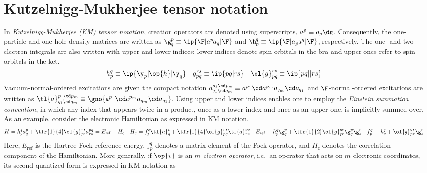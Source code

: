 \chapter{Kutzelnigg-Mukherjee tensor notation}

\minitoc

\begin{ntt}\label{ntt:kutzelnigg-mukherjee-notation}
In \textit{Kutzelnigg-Mukherjee (KM) tensor notation}, creation operators are denoted using superscripts, $a^p\equiv a_p\dg$.
Consequently, the one-particle and one-hole density matrices are written as
$
  \g^p_q
\equiv
  \ip{\F|a^pa_q|\F}
$
and
$
  \h_p^q
\equiv
  \ip{\F|a_p a^q|\F}
$,
respectively.
The one- and two-electron integrals are also written with upper and lower indices: lower indices denote spin-orbitals in the bra and upper ones refer to spin-orbitals in the ket.
\begin{align}
  h_p^q
\equiv
  \ip{\y_p|\op{h}|\y_q}
&&
  g_{pq}^{rs}
\equiv
  \ip{pq|rs}
&&
  \ol{g}_{pq}^{rs}
\equiv
  \ip{pq||rs}
\end{align}
Vacuum-normal-ordered excitations are given the compact notation
$
  a^{p_1\cd p_m}_{q_1\cd q_m}
\equiv
  a^{p_1}\cd a^{p_m}a_{q_m}\cd a_{q_1}
$
and $\F$-normal-ordered excitations are written as
$
  \tl{a}^{p_1\cd p_m}_{q_1\cd q_m}
\equiv
  \gno{a^{p_1}\cd a^{p_m}a_{q_m}\cd a_{q_1}}
$.
Using upper and lower indices enables one to employ the \textit{Einstein summation convention}, in which any index that appears twice in a product, once as a lower index and once as an upper one, is implicitly summed over.
As an example, consider the electronic Hamiltonian as expressed in KM notation.
\begin{align}
  H
=
  h_p^q
  a^p_q
+
  \tfr{1}{4}
  \ol{g}_{pq}^{rs}
  a^{pq}_{rs}
=
  E_{\text{ref}}
+
  H_{\text{c}}
&&
  H_{\text{c}}
=
  f_p^q
  \tl{a}^p_q
+
  \tfr{1}{4}
  \ol{g}_{pq}^{rs}
  \tl{a}^{pq}_{rs}
&&
  E_{\text{ref}}
\equiv
  h_p^q
  \g^p_q
+
  \tfr{1}{2}
  \ol{g}_{pr}^{qs}
  \g^p_q
  \g^r_s
&&
  f_p^q
\equiv
  h_p^q
+
  \ol{g}_{pr}^{qs}
  \g_s^r
\end{align}
Here, $E_{\text{ref}}$ is the Hartree-Fock reference energy, $f_p^q$ denotes a matrix element of the Fock operator, and $H_{\text{c}}$ denotes the correlation component of the Hamiltonian.
More generally, if $\op{v}$ is an \textit{$m$-electron operator}, i.e.\ an operator that acts on $m$ electronic coordinates, its second quantized form is expressed in KM notation as
\begin{align}\label{eq:interaction-tensor}

\end{align}
\end{ntt}
